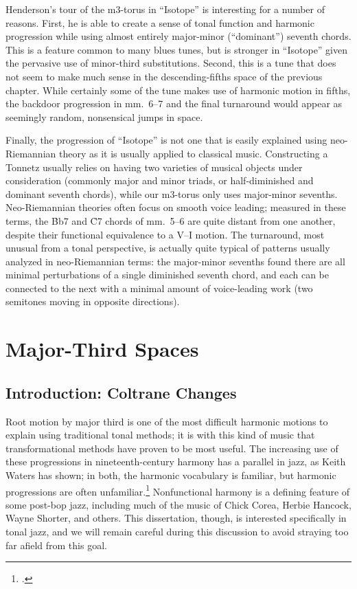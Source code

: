 Henderson's tour of the m3-torus in ``Isotope'' is interesting for a number of
reasons. First, he is able to create a sense of tonal function and harmonic
progression while using almost entirely major-minor (``dominant'') seventh chords. This
is a feature common to many blues tunes, but is stronger in ``Isotope'' given
the pervasive use of minor-third substitutions. Second, this is a tune that
does not seem to make much sense in the descending-fifths \tf space of the
previous chapter. While certainly some of the tune makes use of harmonic
motion in fifths, the backdoor progression in mm.~6--7 and the final
turnaround would appear as seemingly random, nonsensical jumps in \tf space.

Finally, the progression of ``Isotope'' is not one that is easily explained
using neo-Riemannian theory as it is usually applied to classical music.
Constructing a Tonnetz usually relies on having two varieties of musical objects
under consideration (commonly major and minor triads, or half-diminished and
dominant seventh chords), while our m3-torus only uses major-minor sevenths.
Neo-Riemannian theories often focus on smooth voice leading; measured in these
terms, the \h{Bb7} and \h{C7} chords of mm.~5--6 are quite distant from one
another, despite their functional equivalence to a V--I motion. The
turnaround, most unusual from a tonal perspective, is actually quite typical
of patterns usually analyzed in neo-Riemannian terms: the major-minor sevenths
found there are all minimal perturbations of a single diminished seventh
chord, and each can be connected to the next with a minimal amount of
voice-leading work (two semitones moving in opposite directions).

\section{Major-Third Spaces}
\label{sec:maj3-spaces}

\subsection{Introduction: Coltrane Changes}
\label{subsec:maj3-intro}

Root motion by major third is one of the most difficult harmonic motions to
explain using traditional tonal methods; it is with this kind of music that
transformational methods have proven to be most useful. The
increasing use of these progressions in nineteenth-century harmony has a
parallel in jazz, as Keith Waters has shown; in both, the harmonic vocabulary
is familiar, but harmonic progressions are often
unfamiliar.\footcite{waters:2013} Nonfunctional harmony is a defining
feature of some post-bop jazz, including much of the music of Chick Corea,
Herbie Hancock, Wayne Shorter, and others. This dissertation,
though, is interested specifically in tonal jazz, and we will remain careful
during this discussion to avoid straying too far afield from this goal.

